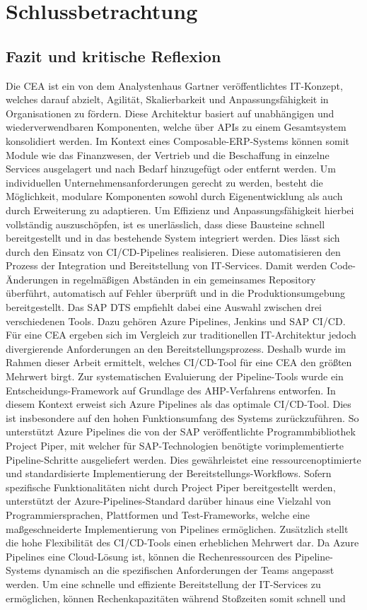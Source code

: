\section{Schlussbetrachtung}

\subsection{Fazit und kritische Reflexion}
Die CEA ist ein von dem Analystenhaus Gartner veröffentlichtes IT-Konzept, welches darauf abzielt, Agilität, Skalierbarkeit und Anpassungsfähigkeit in Organisationen zu fördern. Diese Architektur basiert auf unabhängigen und wiederverwendbaren Komponenten, welche über APIs zu einem Gesamtsystem konsolidiert werden. Im Kontext eines Composable-ERP-Systems können somit Module wie das Finanzwesen, der Vertrieb und die Beschaffung in einzelne Services ausgelagert und nach Bedarf hinzugefügt oder entfernt werden. Um individuellen Unternehmensanforderungen gerecht zu werden, besteht die Möglichkeit, modulare Komponenten sowohl durch Eigenentwicklung als auch durch Erweiterung zu adaptieren. Um Effizienz und Anpassungsfähigkeit hierbei vollständig auszuschöpfen, ist es unerlässlich, dass diese Bausteine schnell bereitgestellt und in das bestehende System integriert werden. Dies lässt sich durch den Einsatz von CI/CD-Pipelines realisieren. Diese automatisieren den Prozess der Integration und Bereitstellung von IT-Services. Damit werden Code-Änderungen in regelmäßigen Abständen in ein gemeinsames Repository überführt, automatisch auf Fehler überprüft und in die Produktionsumgebung bereitgestellt. Das SAP DTS empfiehlt dabei eine Auswahl zwischen drei verschiedenen Tools. Dazu gehören Azure Pipelines, Jenkins und SAP CI/CD. Für eine CEA ergeben sich im Vergleich zur traditionellen IT-Architektur jedoch divergierende Anforderungen an den Bereitstellungsprozess. Deshalb wurde im Rahmen dieser Arbeit ermittelt, welches CI/CD-Tool für eine CEA den größten Mehrwert birgt. Zur systematischen Evaluierung der Pipeline-Tools wurde ein Entscheidungs-Framework auf Grundlage des AHP-Verfahrens entworfen. In diesem Kontext erweist sich Azure Pipelines als das optimale CI/CD-Tool. Dies ist insbesondere auf den hohen Funktionsumfang des Systems zurückzuführen. So unterstützt Azure Pipelines die von der SAP veröffentlichte Programmbibliothek Project Piper, mit welcher für SAP-Technologien benötigte vorimplementierte Pipeline-Schritte ausgeliefert werden. Dies gewährleistet eine ressourcenoptimierte und standardisierte Implementierung der Bereitstellungs-Workflows. Sofern spezifische Funktionalitäten nicht durch Project Piper bereitgestellt werden, unterstützt der Azure-Pipelines-Standard darüber hinaus eine Vielzahl von Programmiersprachen, Plattformen und Test-Frameworks, welche eine maßgeschneiderte Implementierung von Pipelines ermöglichen. Zusätzlich stellt die hohe Flexibilität des CI/CD-Tools einen erheblichen Mehrwert dar. Da Azure Pipelines eine Cloud-Lösung ist, können die Rechenressourcen des Pipeline-Systems dynamisch an die spezifischen Anforderungen der Teams angepasst werden. Um eine schnelle und effiziente Bereitstellung der IT-Services zu ermöglichen, können Rechenkapazitäten während Stoßzeiten somit schnell und 